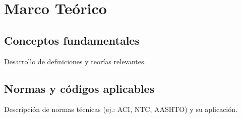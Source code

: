 \chapter{Marco Teórico}
\section{Conceptos fundamentales}
Desarrollo de definiciones y teorías relevantes.
\section{Normas y códigos aplicables}
Descripción de normas técnicas (ej.: ACI, NTC, AASHTO) y su aplicación.

